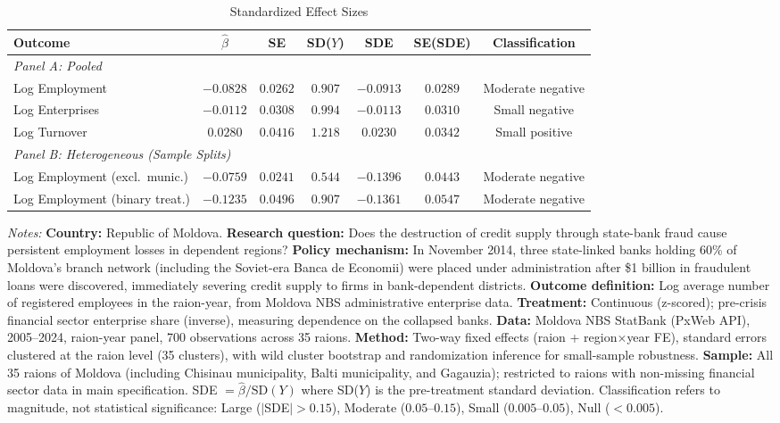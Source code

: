 \begin{table}[htbp]
\centering
\begin{threeparttable}
\caption{Standardized Effect Sizes}
\label{tab:sde}
\begin{adjustbox}{max width=\textwidth}
\begin{tabular}{lcccccc}
\hline\hline
Outcome & $\hat{\beta}$ & SE & SD($Y$) & SDE & SE(SDE) & Classification \\
\hline
\multicolumn{7}{l}{\textit{Panel A: Pooled}} \\
Log Employment & $-0.0828$ & $0.0262$ & $0.907$ & $-0.0913$ & $0.0289$ & Moderate negative \\
Log Enterprises & $-0.0112$ & $0.0308$ & $0.994$ & $-0.0113$ & $0.0310$ & Small negative \\
Log Turnover & $0.0280$ & $0.0416$ & $1.218$ & $0.0230$ & $0.0342$ & Small positive \\
\hline
\multicolumn{7}{l}{\textit{Panel B: Heterogeneous (Sample Splits)}} \\
Log Employment (excl.\ munic.) & $-0.0759$ & $0.0241$ & $0.544$ & $-0.1396$ & $0.0443$ & Moderate negative \\
Log Employment (binary treat.) & $-0.1235$ & $0.0496$ & $0.907$ & $-0.1361$ & $0.0547$ & Moderate negative \\
\hline\hline
\end{tabular}
\end{adjustbox}
\begin{tablenotes}[flushleft]\small
\item \textit{Notes:} \textbf{Country:} Republic of Moldova. \textbf{Research question:} Does the destruction of credit supply through state-bank fraud cause persistent employment losses in dependent regions? \textbf{Policy mechanism:} In November 2014, three state-linked banks holding 60\% of Moldova's branch network (including the Soviet-era Banca de Economii) were placed under administration after \$1 billion in fraudulent loans were discovered, immediately severing credit supply to firms in bank-dependent districts. \textbf{Outcome definition:} Log average number of registered employees in the raion-year, from Moldova NBS administrative enterprise data. \textbf{Treatment:} Continuous (z-scored); pre-crisis financial sector enterprise share (inverse), measuring dependence on the collapsed banks. \textbf{Data:} Moldova NBS StatBank (PxWeb API), 2005--2024, raion-year panel, 700 observations across 35 raions. \textbf{Method:} Two-way fixed effects (raion + region$\times$year FE), standard errors clustered at the raion level (35 clusters), with wild cluster bootstrap and randomization inference for small-sample robustness. \textbf{Sample:} All 35 raions of Moldova (including Chisinau municipality, Balti municipality, and Gagauzia); restricted to raions with non-missing financial sector data in main specification. SDE $= \hat{\beta} / \text{SD}(Y)$ where SD($Y$) is the pre-treatment standard deviation. Classification refers to magnitude, not statistical significance: Large ($|$SDE$| > 0.15$), Moderate ($0.05$--$0.15$), Small ($0.005$--$0.05$), Null ($< 0.005$).
\end{tablenotes}
\end{threeparttable}
\end{table}
